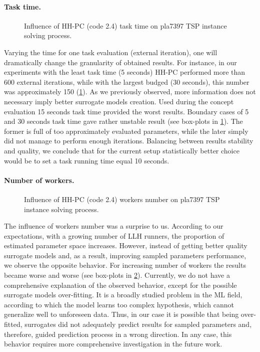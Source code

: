 \paragraph{Task time.}
\begin{figure}[h]
	\centering
	\vspace{-20pt}
	
	\caption{Influence of HH-PC (code 2.4) task time on pla7397 TSP instance solving process.}
	\vspace{-5pt}
	\label{eval:2:pict:task time}
\end{figure}
Varying the time for one task evaluation (external iteration), one will dramatically change the granularity of obtained results. For instance, in our experiments with the least task time (5 seconds) HH-PC performed more than 600 external iterations, while with the largest budged (30 seconds), this number was approximately 150 (\cref{eval:2:pict:task time}). As we previously observed, more information does not necessary imply better surrogate models creation. Used during the concept evaluation 15 seconds task time provided the worst results. Boundary cases of 5 and 30 seconds task time gave rather unstable result (see box-plots in \cref{eval:2:pict:task time}). The former is full of too approximately evaluated parameters, while the later simply did not manage to perform enough iterations. Balancing between results stability and quality, we conclude that for the current setup statistically better choice would be to set a task running time equal 10 seconds. 

\paragraph{Number of workers.}
\begin{figure}[h]
	\centering
	\vspace{-20pt}
	
	\caption{Influence of HH-PC (code 2.4) workers number on pla7397 TSP instance solving process.}
	\vspace{-5pt}
	\label{eval:2:pict:number of workers}
\end{figure}
The influence of workers number was a surprise to us. According to our expectations, with a growing number of LLH runners, the proportion of estimated parameter space increases. However, instead of getting better quality surrogate models and, as a result, improving sampled parameters performance, we observe the opposite behavior. For increasing number of workers the results became worse and worse (see box-plots in \cref{eval:2:pict:number of workers}). Currently, we do not have a comprehensive explanation of the observed behavior, except for the possible surrogate models over-fitting. It is a broadly studied problem in the ML field, according to which the model learns too complex hypothesis, which cannot generalize well to unforeseen data. Thus, in our case it is possible that being over-fitted, surrogates did not adequately predict results for sampled parameters and, therefore, guided prediction process in a wrong direction. In any case, this behavior requires more comprehensive investigation in the future work.


